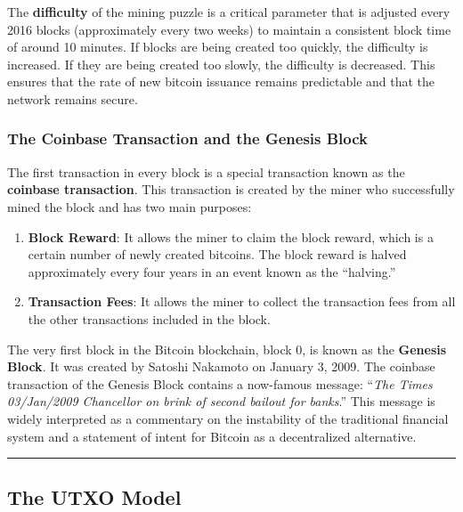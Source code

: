 The \textbf{difficulty} of the mining puzzle is a critical parameter
that is adjusted every 2016 blocks (approximately every two weeks) to
maintain a consistent block time of around 10 minutes. If blocks are
being created too quickly, the difficulty is increased. If they are
being created too slowly, the difficulty is decreased. This ensures that
the rate of new bitcoin issuance remains predictable and that the
network remains secure.

\subsubsection{The Coinbase Transaction and the Genesis
	Block}\label{the-coinbase-transaction-and-the-genesis-block}

The first transaction in every block is a special transaction known as
the \textbf{coinbase transaction}. This transaction is created by the
miner who successfully mined the block and has two main purposes:

\begin{enumerate}
	\def\labelenumi{\arabic{enumi}.}
	\tightlist
	\item
	\textbf{Block Reward}: It allows the miner to claim the block reward,
	which is a certain number of newly created bitcoins. The block reward
	is halved approximately every four years in an event known as the
	``halving.''
	\item
	\textbf{Transaction Fees}: It allows the miner to collect the
	transaction fees from all the other transactions included in the
	block.
\end{enumerate}

The very first block in the Bitcoin blockchain, block 0, is known as the
\textbf{Genesis Block}. It was created by Satoshi Nakamoto on January 3,
2009. The coinbase transaction of the Genesis Block contains a
now-famous message: ``\textit{The Times 03/Jan/2009 Chancellor on brink of
second bailout for banks}.'' This message is widely interpreted as a
commentary on the instability of the traditional financial system and a
statement of intent for Bitcoin as a decentralized alternative.

\begin{center}\rule{0.5\linewidth}{0.5pt}\end{center}

\subsection{The UTXO Model}\label{section-4-the-utxo-model}

